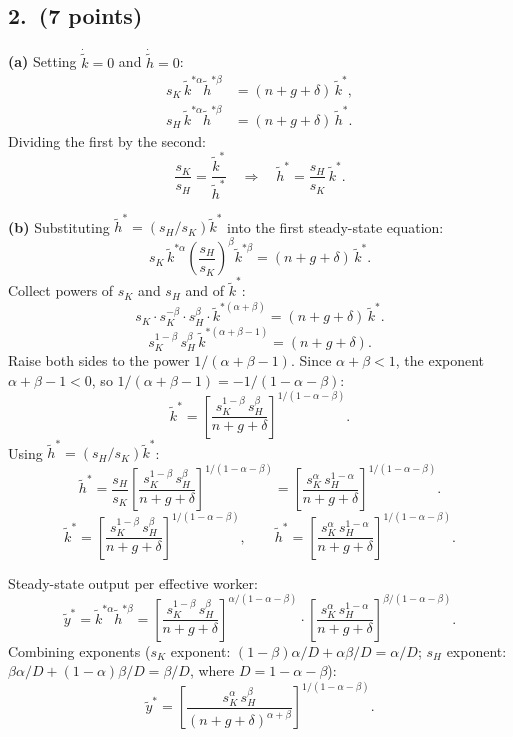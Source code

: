 \documentclass[a4paper,11pt]{article}
\newcommand{\ktilde}{\tilde{k}}
\newcommand{\ytilde}{\tilde{y}}
\newcommand{\htilde}{\tilde{h}}
\begin{document}
\subsection*{2.\ (7 points)}

\begin{answerbox}
\textbf{(a)} Setting $\dot{\ktilde}=0$ and $\dot{\htilde}=0$:
\begin{align*}
    s_K\,\ktilde^{*\alpha}\htilde^{*\beta} &= (n+g+\delta)\,\ktilde^*, \\
    s_H\,\ktilde^{*\alpha}\htilde^{*\beta} &= (n+g+\delta)\,\htilde^*.
\end{align*}
Dividing the first by the second:
\[
    \frac{s_K}{s_H} = \frac{\ktilde^*}{\htilde^*}
    \quad\Longrightarrow\quad
    \boxed{\htilde^* = \frac{s_H}{s_K}\,\ktilde^*.}
\]

\textbf{(b)} Substituting $\htilde^* = (s_H/s_K)\ktilde^*$ into the first steady-state equation:
\[
    s_K\,\ktilde^{*\alpha}\left(\frac{s_H}{s_K}\right)^{\!\beta}\ktilde^{*\beta}
    = (n+g+\delta)\,\ktilde^*.
\]
Collect powers of $s_K$ and $s_H$ and of $\ktilde^*$:
\[
    s_K\cdot s_K^{-\beta}\cdot s_H^{\beta}\cdot \ktilde^{*(\alpha+\beta)}
    = (n+g+\delta)\,\ktilde^*.
\]
\[
    s_K^{1-\beta}\,s_H^{\beta}\,\ktilde^{*(\alpha+\beta-1)} = (n+g+\delta).
\]
Raise both sides to the power $1/(\alpha+\beta-1)$.  Since $\alpha+\beta < 1$, the exponent
$\alpha+\beta-1 < 0$, so $1/(\alpha+\beta-1) = -1/(1-\alpha-\beta)$:
\[
    \ktilde^* = \left[\frac{s_K^{1-\beta}\,s_H^{\beta}}{n+g+\delta}
    \right]^{1/(1-\alpha-\beta)}.
\]
Using $\htilde^* = (s_H/s_K)\ktilde^*$:
\[
    \htilde^* = \frac{s_H}{s_K}\left[\frac{s_K^{1-\beta}\,s_H^{\beta}}{n+g+\delta}
    \right]^{1/(1-\alpha-\beta)}
    = \left[\frac{s_K^{\alpha}\,s_H^{1-\alpha}}{n+g+\delta}
    \right]^{1/(1-\alpha-\beta)}.
\]
\[
    \boxed{\ktilde^* = \left[\frac{s_K^{1-\beta}\,s_H^{\beta}}{n+g+\delta}
    \right]^{1/(1-\alpha-\beta)},\qquad
    \htilde^* = \left[\frac{s_K^{\alpha}\,s_H^{1-\alpha}}{n+g+\delta}
    \right]^{1/(1-\alpha-\beta)}.}
\]

Steady-state output per effective worker:
\[
    \ytilde^* = \ktilde^{*\alpha}\htilde^{*\beta}
    = \left[\frac{s_K^{1-\beta}\,s_H^{\beta}}{n+g+\delta}\right]^{\!\alpha/(1-\alpha-\beta)}
      \cdot\left[\frac{s_K^{\alpha}\,s_H^{1-\alpha}}{n+g+\delta}\right]^{\!\beta/(1-\alpha-\beta)}.
\]
Combining exponents ($s_K$ exponent: $(1-\beta)\alpha/D + \alpha\beta/D = \alpha/D$;
$s_H$ exponent: $\beta\alpha/D + (1-\alpha)\beta/D = \beta/D$, where $D = 1-\alpha-\beta$):
\[
    \boxed{\ytilde^* = \left[\frac{s_K^{\alpha}\,s_H^{\beta}}{(n+g+\delta)^{\alpha+\beta}}
    \right]^{1/(1-\alpha-\beta)}.}
\]
\end{answerbox}
\end{document}
